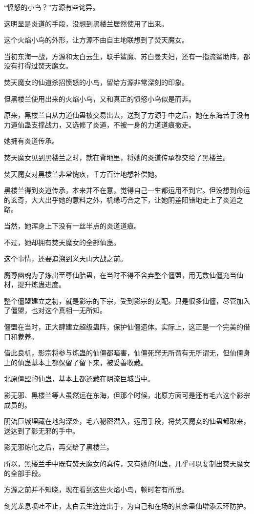 \begin{this_body}
“愤怒的小鸟？”方源有些诧异。

这明显是炎道的手段，没想到黑楼兰居然使用了出来。

这个火焰小鸟的外形，让方源不由自主地联想到了焚天魔女。

当初东海一战，方源和太白云生，联手鲨魔、苏白曼夫妇，还有一指流鲨助阵，都没有打得过焚天魔女。

焚天魔女的仙道杀招愤怒的小鸟，留给方源非常深刻的印象。

但黑楼兰使用出来的火焰小鸟，又和真正的愤怒小鸟似是而非。

原来，黑楼兰自从力道仙蛊被交易出去，送到了方源手中之后，她在东海苦于没有力道仙蛊支撑战力，又选修了炎道，不被一身的力道道痕撤走。

她拥有炎道传承。

焚天魔女见到黑楼兰之时，就在背地里，将她的炎道传承都交给了黑楼兰。

焚天魔女对黑楼兰非常愧疚，千方百计地想补偿她。

黑楼兰得到炎道传承，本来并不在意，觉得自己一生都运用不到它。但没想到命运的玄奇，大大出乎她的意料之外，机缘巧合之下，让她阴差阳错地走上了炎道之路。

当然，她浑身上下没有一丝半点的炎道道痕。

不过，她却拥有焚天魔女的全部仙蛊。

这个事情，还要追溯到义天山大战之前。

魔尊幽魂为了炼出至尊仙胎蛊，在当时不得不舍弃整个僵盟，用无数仙僵充当仙材，提升炼蛊进度。

整个僵盟建立之初，就是影宗的下宗，受到影宗的支配。只是很多仙僵，尽管加入了僵盟，也对这个真相一无所知。

僵盟在当时，正大肆建立超级蛊阵，保护仙僵遗体。实际上，这正是一个完美的借口和豢养。

借此良机，影宗将参与炼蛊的仙僵都暗害，仙僵死窍无所谓有无所谓无，但仙僵身上的仙蛊基本上都保留了留下来，被妥善收藏。

北原僵盟的仙蛊，基本上都还藏在阴流巨城当中。

影无邪、黑楼兰等人虽然远在东海，但那个时候，北原方面可是还有毛六这个影宗成员的。

阴流巨城埋藏在地沟深处，毛六秘密潜入，运用手段，将焚天魔女的仙蛊都取来，送达到了影无邪的手中。

影无邪炼化之后，再交给了黑楼兰。

所以，黑楼兰手中既有焚天魔女的真传，又有她的仙蛊，几乎可以复制出焚天魔女的全部手段。

方源之前并不知晓，现在看到这些火焰小鸟，顿时若有所思。

剑光龙息喷吐不止，太白云生连连出手，为自己和在场的其余蛊仙增添云环防护。

\end{this_body}

